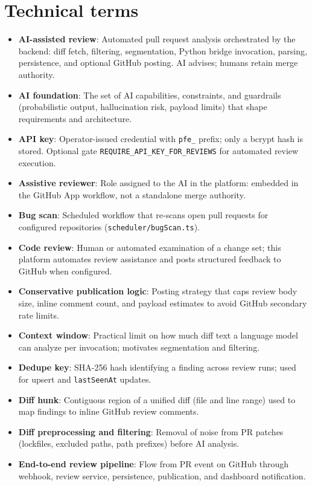 \section*{Technical terms}
\begin{itemize}
\item \textbf{AI-assisted review}: Automated pull request analysis orchestrated by the backend: diff fetch, filtering, segmentation, Python bridge invocation, parsing, persistence, and optional GitHub posting. AI advises; humans retain merge authority.
\item \textbf{AI foundation}: The set of AI capabilities, constraints, and guardrails (probabilistic output, hallucination risk, payload limits) that shape requirements and architecture.
\item \textbf{API key}: Operator-issued credential with \texttt{pfe\_} prefix; only a bcrypt hash is stored. Optional gate \texttt{REQUIRE\_API\_KEY\_FOR\_REVIEWS} for automated review execution.
\item \textbf{Assistive reviewer}: Role assigned to the AI in the platform: embedded in the GitHub App workflow, not a standalone merge authority.
\item \textbf{Bug scan}: Scheduled workflow that re-scans open pull requests for configured repositories (\texttt{scheduler/bugScan.ts}).
\item \textbf{Code review}: Human or automated examination of a change set; this platform automates review assistance and posts structured feedback to GitHub when configured.
\item \textbf{Conservative publication logic}: Posting strategy that caps review body size, inline comment count, and payload estimates to avoid GitHub secondary rate limits.
\item \textbf{Context window}: Practical limit on how much diff text a language model can analyze per invocation; motivates segmentation and filtering.
\item \textbf{Dedupe key}: SHA-256 hash identifying a finding across review runs; used for upsert and \texttt{lastSeenAt} updates.
\item \textbf{Diff hunk}: Contiguous region of a unified diff (file and line range) used to map findings to inline GitHub review comments.
\item \textbf{Diff preprocessing and filtering}: Removal of noise from PR patches (lockfiles, excluded paths, path prefixes) before AI analysis.
\item \textbf{End-to-end review pipeline}: Flow from PR event on GitHub through webhook, review service, persistence, publication, and dashboard notification.

\end{itemize}
